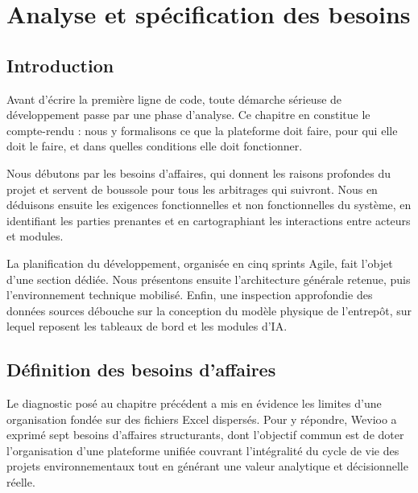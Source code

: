 
\chapter{Analyse et spécification des besoins}

\section*{Introduction}

Avant d'écrire la première ligne de code, toute démarche sérieuse
de développement passe par une phase d'analyse. Ce chapitre en
constitue le compte-rendu : nous y formalisons ce que la plateforme
doit faire, pour qui elle doit le faire, et dans quelles conditions
elle doit fonctionner.

Nous débutons par les besoins d'affaires, qui donnent les raisons
profondes du projet et servent de boussole pour tous les arbitrages
qui suivront. Nous en déduisons ensuite les exigences fonctionnelles
et non fonctionnelles du système, en identifiant les parties prenantes
et en cartographiant les interactions entre acteurs et modules.

La planification du développement, organisée en cinq sprints Agile,
fait l'objet d'une section dédiée. Nous présentons ensuite
l'architecture générale retenue, puis l'environnement technique
mobilisé. Enfin, une inspection approfondie des données sources
débouche sur la conception du modèle physique de l'entrepôt,
sur lequel reposent les tableaux de bord et les modules d'IA.

\section{Définition des besoins d'affaires}

Le diagnostic posé au chapitre précédent a mis en évidence les
limites d'une organisation fondée sur des fichiers Excel dispersés.
Pour y répondre, Wevioo a exprimé sept besoins d'affaires
structurants, dont l'objectif commun est de doter l'organisation
d'une plateforme unifiée couvrant l'intégralité du cycle de vie
des projets environnementaux tout en générant une valeur analytique
et décisionnelle réelle.

